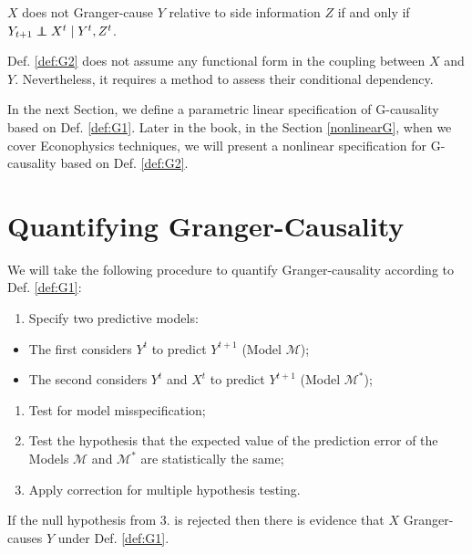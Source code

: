 \documentclass[]{book}
\providecommand{\tightlist}{%
  \setlength{\itemsep}{0pt}\setlength{\parskip}{0pt}}
\theoremstyle{definition}
\theoremstyle{definition}
\theoremstyle{definition}
\theoremstyle{remark}
\let\BeginKnitrBlock\begin \let\EndKnitrBlock\end
\begin{document}
\BeginKnitrBlock{definition}
\protect\hypertarget{def:G2}{}{\label{def:G2} }\(X\) does not Granger-cause
\(Y\) relative to side information \(Z\) if and only if
\(Y_{t+1} \perp\!\!\!\!\perp X^{t} \; | \; Y^{t}, Z^{t}\).
\EndKnitrBlock{definition}

Def. \ref{def:G2} does not assume any functional form in the coupling
between \(X\) and \(Y\). Nevertheless, it requires a method to assess
their conditional dependency.

In the next Section, we define a parametric linear specification of
G-causality based on Def. \ref{def:G1}. Later in the book, in the
Section \ref{nonlinearG}, when we cover Econophysics techniques, we will
present a nonlinear specification for G-causality based on Def.
\ref{def:G2}.

\section{Quantifying Granger-Causality}\label{LinearG}

We will take the following procedure to quantify Granger-causality
according to Def. \ref{def:G1}:

\begin{enumerate}
\def\labelenumi{\arabic{enumi}.}
\tightlist
\item
  Specify two predictive models:
\end{enumerate}

\begin{itemize}
\tightlist
\item
  The first considers \(Y^t\) to predict \(Y^{t+1}\) (Model
  \(\mathcal{M}\));
\item
  The second considers \(Y^t\) and \(X^t\) to predict \(Y^{t+1}\) (Model
  \(\mathcal{M}^*\));
\end{itemize}

\begin{enumerate}
\def\labelenumi{\arabic{enumi}.}
\setcounter{enumi}{1}
\tightlist
\item
  Test for model misspecification;
\item
  Test the hypothesis that the expected value of the prediction error of
  the Models \(\mathcal{M}\) and \(\mathcal{M}^*\) are statistically the
  same;
\item
  Apply correction for multiple hypothesis testing.
\end{enumerate}

If the null hypothesis from 3. is rejected then there is evidence that
\(X\) Granger-causes \(Y\) under Def. \ref{def:G1}.
\end{document}
